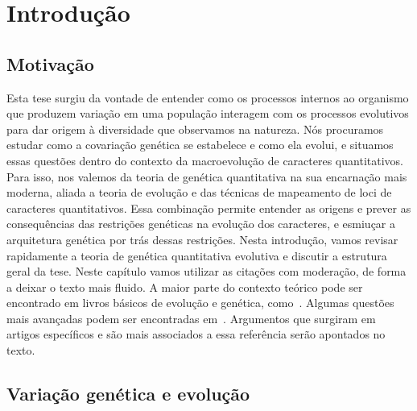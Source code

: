 \cleardoublepage

\pagestyle{fancy}


\chapter{Introdução}\label{intro}


\section{Motivação}\label{intro:historico}

\begin{refsection}

Esta tese surgiu da vontade de entender como os processos internos ao
organismo que produzem variação em uma população interagem com os processos
evolutivos para dar origem à diversidade que observamos na natureza. Nós
procuramos estudar como a covariação genética se estabelece e como ela evolui,
e situamos essas questões dentro do contexto da macroevolução de caracteres
quantitativos. Para isso, nos valemos da teoria de genética quantitativa na
sua encarnação mais moderna, aliada a teoria de evolução e das técnicas de
mapeamento de loci de caracteres quantitativos. Essa combinação permite
entender as origens e prever as consequências das restrições genéticas na
evolução dos caracteres, e esmiuçar a arquitetura genética por trás dessas
restrições. Nesta introdução, vamos revisar rapidamente a teoria de genética
quantitativa evolutiva e discutir a estrutura geral da tese. Neste capítulo
vamos utilizar as citações com moderação, de forma a deixar o texto mais
fluido. A maior parte do contexto teórico pode ser encontrado em livros
básicos de evolução e genética, como~\textcite{Falconer1996-ot, Lynch1998-ql,
Barton2007-hq}. Algumas questões mais avançadas podem ser encontradas
em~\textcite{Rice2004-jf, Buerger2000-ez}. Argumentos que surgiram em artigos
específicos e são mais associados a essa referência serão apontados no texto.

\section{Variação genética e evolução} 


\end{refsection}
